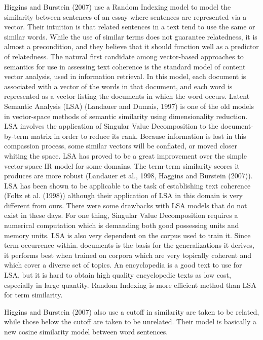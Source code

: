 Higgins and Burstein (2007) use a Random Indexing model to model the similarity between sentences of an essay where sentences are represented via a vector. 
Their intuition is that related sentences in a text tend to use the same or similar words. While the use of similar terms does not guarantee relatedness, it is almost a precondition, and they believe that it should function well as a predictor of relatedness. 
The natural first candidate among vector-based approaches to semantics for use in assessing text coherence is the standard model of content vector analysis, used in information retrieval. 
In this model, each document is associated with a vector of the words in that document, and each word is represented as a vector listing the documents in which the word occurs. 
Latent Semantic Analysis (LSA) (Landauer and Dumais, 1997) is one of the old models in vector-space methods of semantic similarity using dimensionality reduction. 
LSA involves the application of Singular Value Decomposition to the document-by-term matrix in order to reduce its rank. 
Because information is lost in this compassion process, some similar vectors will be conflated, or moved closer whiting the space. 
LSA has proved to be a great improvement over the simple vector-space IR model for some domains. 
The term-term similarity scores it produces are more robust (Landauer et al., 1998, Haggins and Burstein (2007)).
LSA has been shown to be applicable to the task of establishing text coherence (Foltz et al. (1998)) although their application of LSA in this domain is very different from ours. 
There were some drawbacks with LSA models that do not exist in these days. 
For one thing, Singular Value Decomposition requires a numerical computation which is demanding both good possessing units and memory units. 
LSA is also very dependent on the corpus used to train it. 
Since term-occurrence within. documents is the basis for the generalizations it derives, it performs best when trained on corpora which are very topically coherent and which cover a diverse set of topics. 
An encyclopedia is a good text to use for LSA, but it is hard to obtain high quality encyclopedic texts as low cost, especially in large quantity. 
Random Indexing is more efficient method than LSA for term similarity. 

Higgins and Burstein (2007) also use a cutoff in similarity are taken to be related, while those below the cutoff are taken to be unrelated. 
Their model is basically a new cosine similarity model between word sentences. 


